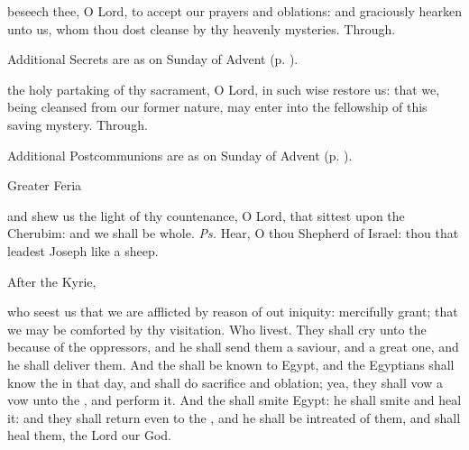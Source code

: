 \secret
{} beseech thee, O Lord, to accept our prayers and oblations: and graciously hearken unto us, whom thou dost cleanse by thy heavenly mysteries. Through.
\begin{rubric}
    Additional Secrets are as on  Sunday of Advent (p. \pageref{AdventI}).
\end{rubric}
\postcommunion
{} the holy partaking of thy sacrament, O Lord, in such wise restore us: that we, being cleansed from our former nature, may enter into the fellowship of this saving mystery. Through.
\begin{rubric}
    Additional Postcommunions are as on  Sunday of Advent (p. \pageref{AdventI}).
\end{rubric}

\begin{inhead}
{Greater Feria}
\end{inhead}
\par\noindent
{}
\introit
{} and shew us the light of thy countenance, O Lord, that sittest upon the Cherubim: and we shall be whole. \textit{Ps.} Hear, O thou Shepherd of Israel: thou that leadest Joseph like a sheep.
\begin{rubric}
    After the Kyrie,
\end{rubric}
\collect
{} who seest us that we are afflicted by reason of out iniquity: mercifully grant; that we may be comforted by thy visitation. Who livest.
 They shall cry unto the  because of the oppressors, and he shall send them a saviour, and a great one, and he shall deliver them. And the  shall be known to Egypt, and the Egyptians shall know the  in that day, and shall do sacrifice and oblation; yea, they shall vow a vow unto the , and perform it. And the  shall smite Egypt: he shall smite and heal it: and they shall return even to the , and he shall be intreated of them, and shall heal them,
the Lord our God.

